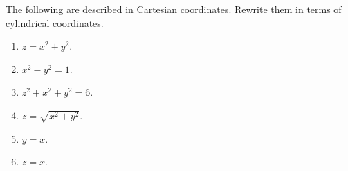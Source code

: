 \begin{ex} The following are described in Cartesian coordinates. Rewrite them in terms of cylindrical coordinates.

\begin{enumerate}
\item $z=x^{2}+y^{2}$.

\item $x^{2}-y^{2}=1$.

\item $z^{2}+x^{2}+y^{2}=6$.

\item $z=\sqrt{x^{2}+y^{2}}$.

\item $y=x$.

\item $z=x$.
\end{enumerate}
\end{ex}

